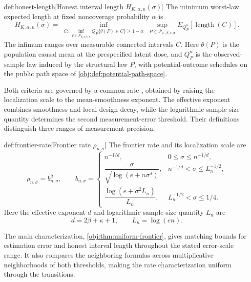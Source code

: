\documentclass[11pt]{article}
\begin{document}
\begin{definitionv}{def:honest-length}[Honest interval length $H_{K,\alpha,n}(\sigma)$]
The minimum worst-law expected length at fixed noncoverage probability \(\alpha\) is
\[
H_{K,\alpha,n}(\sigma)
=
\inf_{\substack{
C:\ \inf_{P\in\mathcal P_{K,\beta,\kappa,\sigma}}
Q_P^n\{\theta(P)\in C\}\ge 1-\alpha
}}
\sup_{P\in\mathcal P_{K,\beta,\kappa,\sigma}}
E_{Q_P^n}\!\left[\operatorname{length}(C)\right].
\]
The infimum ranges over measurable connected intervals \(C\). Here \(\theta(P)\) is the population causal mean at the prespecified latent dose, and \(Q_P^n\) is the observed-sample law induced by the structural law \(P\), with potential-outcome schedules on the public path space of \cref{obj:def:potential-path-space}.
\end{definitionv}

Both criteria are governed by a common rate , obtained by raising the localization scale  to the mean-smoothness exponent. The effective exponent  combines smoothness and local design decay, while the logarithmic sample-size quantity  determines the second measurement-error threshold. Their definitions distinguish three ranges of measurement precision.

\begin{definitionv}{def:frontier-rate}[Frontier rate \(\rho_{n,\sigma}\)]
The frontier rate and its localization scale are
\[
\rho_{n,\sigma}=b_{n,\sigma}^{\beta},
\qquad
b_{n,\sigma}=
\begin{cases}
n^{-1/d},&0\le\sigma\le n^{-1/d},\\[2pt]
\dfrac{\sigma}{\sqrt{\log(e+n\sigma^d)}},
&n^{-1/d}<\sigma\le L_n^{-1/2},\\[6pt]
\dfrac{\log(e+\sigma^2L_n)}{L_n},
&L_n^{-1/2}<\sigma\le1/4.
\end{cases}
\]
Here the effective exponent \(d\) and logarithmic sample-size quantity \(L_n\) are
\[
d=2\beta+\kappa+1,
\qquad
L_n=\log(en).
\]
\end{definitionv}

The main characterization, \cref{obj:thm:uniform-frontier}, gives matching bounds for estimation error and honest interval length throughout the stated error-scale range. It also compares the neighboring formulas across multiplicative neighborhoods of both thresholds, making the rate characterization uniform through the transitions.
\end{document}
